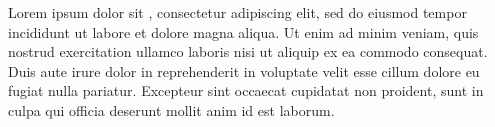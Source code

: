 \documentclass{book}
\begin{document}
\beginnumbering
\pstart
Lorem ipsum dolor sit , consectetur adipiscing elit, sed do eiusmod tempor incididunt ut labore et dolore magna aliqua. Ut enim ad minim veniam, quis nostrud exercitation ullamco laboris nisi ut aliquip ex ea commodo consequat. Duis aute irure dolor in reprehenderit in voluptate velit esse  cillum dolore eu fugiat nulla pariatur. Excepteur sint occaecat cupidatat non proident, sunt in culpa qui officia deserunt mollit  anim id est laborum.
\pend
\endnumbering
\end{document}
